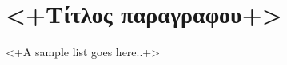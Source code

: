 \section{<+Τίτλος παραγραφου+>}

\begin{itemize*}
    \item <+A sample list goes here..+>
\end{itemize*}
